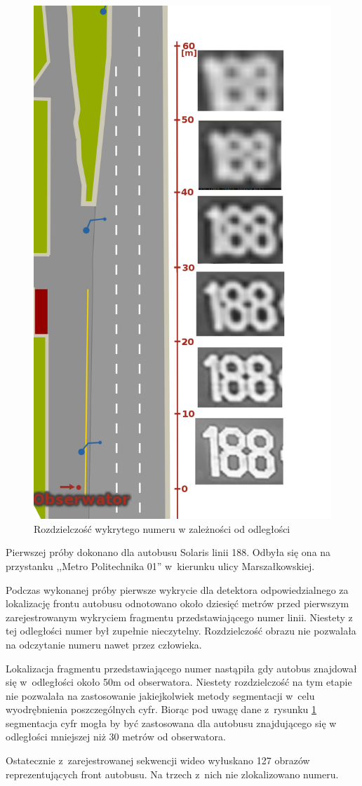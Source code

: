 \begin{figure}[!h]
    \centering
    \includegraphics[height=0.9\textwidth]{img/exp_numer_od_odleglosci}
    \caption{Rozdzielczość wykrytego numeru w zależności od odległości}
    \label{fig:dist2res}
\end{figure}

Pierwszej próby dokonano dla autobusu Solaris linii 188. Odbyła się
ona na przystanku ,,Metro Politechnika 01'' w~kierunku ulicy
Marszałkowskiej.

Podczas wykonanej próby pierwsze wykrycie dla detektora
odpowiedzialnego za lokalizację frontu autobusu odnotowano około dziesięć
metrów przed pierwszym zarejestrowanym wykryciem fragmentu
przedstawiającego numer linii. Niestety z tej odległości numer był
zupełnie nieczytelny. Rozdzielczość obrazu nie pozwalała na odczytanie
numeru nawet przez człowieka.

Lokalizacja fragmentu przedstawiającego numer nastąpiła gdy autobus
znajdował się w~odległości około 50m od obserwatora. Niestety
rozdzielczość na tym etapie nie pozwalała na zastosowanie jakiejkolwiek
metody segmentacji w~celu wyodrębnienia poszczególnych cyfr. Biorąc pod
uwagę dane z~rysunku \ref{fig:dist2res} segmentacja cyfr mogła by być
zastosowana dla autobusu znajdującego się w odległości mniejszej niż
30 metrów od obserwatora. 

Ostatecznie z~zarejestrowanej sekwencji wideo wyłuskano 127 obrazów
reprezentujących front autobusu. Na trzech z~nich nie zlokalizowano
numeru. 


